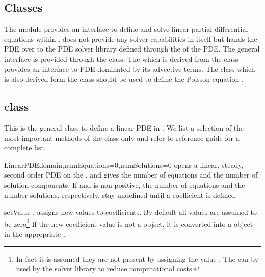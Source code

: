 \subsection{Classes}
The module \linearPDEs provides an interface to define and solve linear partial
differential equations within \escript. \linearPDEs does not provide any
solver capabilities in itself but hands the PDE over to
the PDE solver library defined through the \Domain of the PDE.
The general interface is provided through the \LinearPDE class. The
\AdvectivePDE which is derived from the \LinearPDE class
provides an interface to PDE dominated by its advective terms. The \Poisson
class which is also derived form the \LinearPDE class should be used
to define the Poisson equation .

\subsection{\LinearPDE class}
This is the general class to define a linear PDE in \escript. We list a selection of the most
important methods of the class only and refer to reference guide \ReferenceGuide for a complete list.

\begin{classdesc}{LinearPDE}{domain,numEquations=0,numSolutions=0}
opens a linear, steady, second order PDE on the \Domain {}. 
and  gives the number of equations and the number of solution components.
If  and  is non-positive, the number of equations
and the number solutions, respectively, stay undefined until a coefficient is
defined.
\end{classdesc}

\begin{methoddesc}[LinearPDE]{setValue}{
,
}
assigns new values to coefficients. By default all values are assumed to be zero\footnote{
In fact it is assumed they are not present by assigning the value . The
can by used by the solver library to reduce computational costs.
}
If the new coefficient value is not a \Data object, it is converted into a \Data object in the
appropriate \FunctionSpace.
\end{methoddesc}

